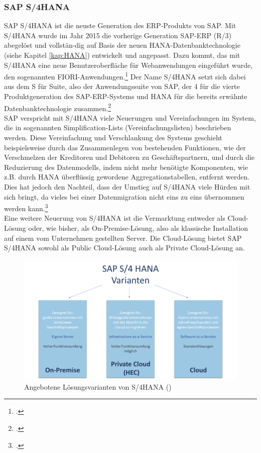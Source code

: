 \subsubsection{SAP S/4HANA} 
SAP S/4HANA ist die neuste Generation des ERP-Produkts von SAP. Mit S/4HANA wurde im Jahr 2015 die vorherige Generation SAP-ERP (R/3) abegelöst und vollstän-dig auf Basis der neuen HANA-Datenbanktechnologie (siehe Kapitel \ref{kap:HANA}) entwickelt und angepasst. Dazu kommt, das mit S/4HANA eine neue Benutzeroberfläche für Webanwendungen eingeführt wurde, den sogenannten FIORI-Anwendungen.\footcite[Vgl.][]{was-hana} Der Name \glqq{}S/4HANA\grqq{} setzt sich dabei aus dem \glqq{}S\grqq{} für \glqq{}Suite\grqq{}, also der Anwendungssuite von SAP, der \glqq{}4\grqq{} für die vierte Produktgeneration des SAP-ERP-Systems und \glqq{}HANA\grqq{} für die bereits erwähnte Datenbanktechnologie zusammen.\footcite[Vgl.][]{rz10-s4hana}\\SAP verspricht mit S/4HANA viele Neuerungen und Vereinfachungen im System, die in sogenannten \glqq{}Simplification-Lists\grqq{} (Vereinfachungslisten) beschrieben werden. Diese Vereinfachung und Verschlankung des Systems geschieht beispielsweise durch das Zusammenlegen von bestehenden Funktionen, wie der Verschmelzen der Kreditoren und Debitoren zu Geschäftspartnern, und durch die Reduzierung des Datenmodells, indem nicht mehr benötigte Komponenten, wie z.B. durch HANA überflüssig gewordene Aggregationstabellen, entfernt werden. Dies hat jedoch den Nachteil, dass der Umstieg auf S/4HANA viele Hürden mit sich bringt, da vieles bei einer Datenmigration nicht eins zu eins übernommen werden kann.\footcite[Vgl.][]{ibsolution}\\Eine weitere Neuerung von S/4HANA ist die Vermarktung entweder als Cloud-Lösung oder, wie bisher, als On-Premise-Lösung, also als klassische Installation auf einem vom Unternehmen gestellten Server. Die Cloud-Lösung bietet SAP S/4HANA sowohl als \glqq{}Public Cloud\grqq{}-Lösung auch als \glqq{}Private Cloud\grqq{}-Lösung an.
\begin{figure}[h]
    \centering
    \includegraphics[scale=1.3]{./Bilder/HANA-Varianten.png}
    \caption[S/4HANA Lösungen]{Angebotene Lösungsvarianten von S/4HANA (\cite[][]{rz10-s4hana})}
\end{figure}
